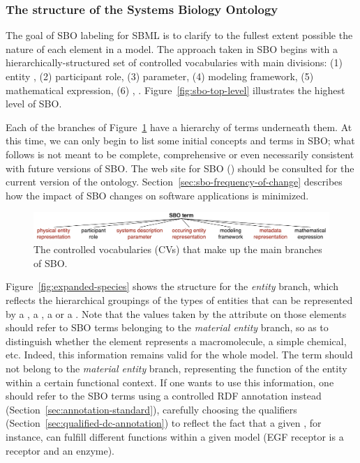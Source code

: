 \subsubsection{The structure of the Systems Biology Ontology}

The goal of SBO labeling for SBML is to clarify to the fullest
extent possible the nature of each element in a model.  The
approach taken in SBO begins with a hierarchically-structured set
of controlled vocabularies with  main divisions: (1)  entity , (2) participant role, (3)  parameter, (4) modeling framework, (5)
mathematical expression, (6) , .
Figure~\vref{fig:sbo-top-level} illustrates the highest level of
SBO.

Each of the  branches of Figure~\ref{fig:sbo-top-level} have a
hierarchy of terms underneath them.  At this time, we can only
begin to list some initial concepts and terms in SBO; what follows
is not meant to be complete, comprehensive or even necessarily
consistent with future versions of SBO.  The web site for SBO
(\sboref) should be consulted for the current version of the
ontology.  Section~\ref{sec:sbo-frequency-of-change} describes how
the impact of SBO changes on software applications is minimized.

\begin{figure}[tbh]
  \centering
  \includegraphics[scale = 0.8]{figs/sbo-top-level}
  \vspace*{1ex}
  \caption{The  controlled vocabularies (CVs) that
      make up the main branches of SBO.}
  \label{fig:sbo-top-level}
\end{figure}

Figure~\vref{fig:expanded-species} shows the structure for the \emph{ entity } branch, which reflects the hierarchical groupings of the types of entities that can be represented by a , a , a  or a . Note that the values taken by the  attribute on those elements should refer to SBO terms belonging to the \emph{material entity} branch, so as to distinguish whether the element represents a macromolecule, a simple chemical, etc. Indeed, this information remains valid for the whole model. The term should not belong to the \emph{material entity} branch, representing the function of the entity within a certain functional context. If one wants to use this information, one should refer to the SBO terms using a controlled RDF annotation instead (Section~\ref{sec:annotation-standard}), carefully choosing the qualifiers (Section~\ref{sec:qualified-dc-annotation}) to reflect the fact that a given , for instance, can fulfill different functions within a given model (\eg EGF receptor is a receptor and an enzyme).

